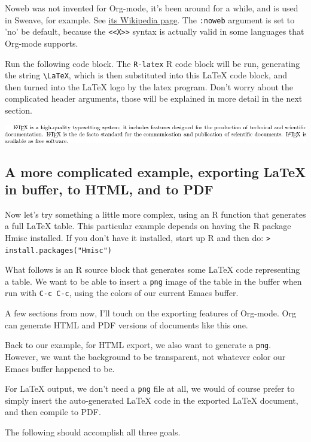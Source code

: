 \documentclass[11pt]{article}
\begin{document}
Noweb was not invented for Org-mode, it's been around for a while, and is used in Sweave, for example. See \href{http://en.wikipedia.org/wiki/Noweb}{its Wikipedia page}. The \texttt{:noweb} argument is set to 'no' be default, because the \texttt{<<X>>} syntax is actually valid in some languages that Org-mode supports.

Run the following code block. The \texttt{R-latex} R code block will be run, generating the string \texttt{\textbackslash{}LaTeX}, which is then substituted into this \LaTeX{} code block, and then turned into the \LaTeX{} logo by the latex program. Don't worry about the complicated header arguments, those will be explained in more detail in the next section. 

\includegraphics[width=.9\linewidth]{latex-logo.png}
\subsection*{A more complicated example, exporting \LaTeX{} in buffer, to HTML, and to PDF}
\label{sec-6-2}

Now let's try something a little more complex, using an R function that generates a full \LaTeX{} table. This particular example depends on having the R package Hmisc installed. If you don't have it installed, start up R and then do: \texttt{> install.packages("Hmisc")}

What follows is an R source block that generates some \LaTeX{} code representing a table.  We want to be able to insert a \texttt{png} image of the table in the buffer when run with \texttt{C-c C-c}, using the colors of our current Emacs buffer.

A few sections from now, I'll touch on the exporting features of Org-mode.  Org can generate HTML and PDF versions of documents like this one.

Back to our example, for HTML export, we also want to generate a \texttt{png}. However, we want the background to be transparent, not whatever color our Emacs buffer happened to be.

For \LaTeX{} output, we don't need a \texttt{png} file at all, we would of course prefer to simply insert the auto-generated \LaTeX{} code in the exported \LaTeX{} document, and then compile to PDF. 

The following should accomplish all three goals.  
\end{document}
